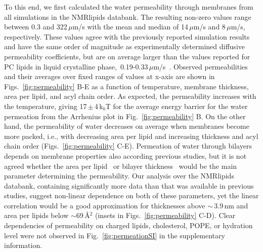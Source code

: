 \documentclass[fleqn,10pt]{wlscirep}
\begin{document}
To this end, we first calculated the water permeability through membranes from all simulations in the NMRlipids databank.  The resulting non-zero values range between 0.3 and 322\,$\mu$m/s with the mean and median of 14\,$\mu$m/s and 8\,$\mu$m/s, respectively. These values agree with the previously reported simulation results~\cite{venable19,camilo2022} and have the same order of magnitude as experimentally determined diffusive permeability coefficients, but are on average larger than the values reported for PC lipids in liquid crystalline phase,~0.19-0.33\,$\mu$m/s~\cite{jansen95}. Observed permeabilities and their averages over fixed ranges of values at x-axis are shown in Figs.~\ref{fig:permeability} B-E as a function of temperature, membrane thickness, area per lipid, and acyl chain order.  
As expected, the permeability increases with the temperature, giving 17\,$\pm$\,4\,k$_b$T for the average energy barrier for the water permeation from the Arrhenius plot in Fig.~\ref{fig:permeability} B. On the other hand, the permeability of water decreases on average when membranes become more packed, i.e., with decreasing area per lipid and increasing thickness and acyl chain order (Figs.~\ref{fig:permeability} C-E). Permeation of water through bilayers depends on membrane properties also according previous studies, but it is not agreed whether the area per lipid~\cite{nagle08} or bilayer thickness~\cite{frallicciardi22} would be the main parameter determining the permeability. 
Our analysis over the NMRlipids databank, containing significantly more data than that was available in previous studies, suggest non-linear dependence on both of these parameters, yet the linear correlation would be a good approximation for thicknesses above $\sim$\,3.9\,nm and area per lipids below $\sim$69\,Å$^2$ (insets in Figs.~\ref{fig:permeability} C-D).
Clear dependencies of permeability on charged lipids, cholesterol, POPE, or hydration level were not observed in Fig.~\ref{fig:permeationSI} in the supplementary information.
%
%
%
\end{document}
